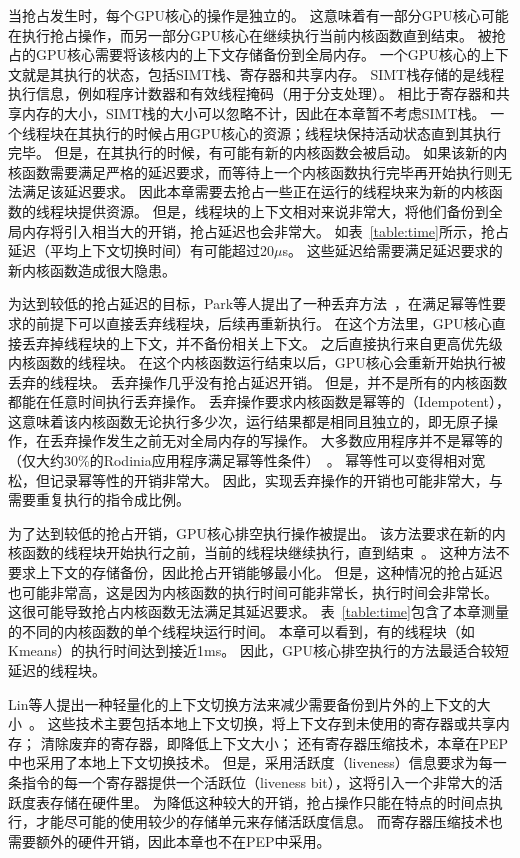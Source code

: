 当抢占发生时，每个GPU核心的操作是独立的。
这意味着有一部分GPU核心可能在执行抢占操作，而另一部分GPU核心在继续执行当前内核函数直到结束。
被抢占的GPU核心需要将该核内的上下文存储备份到全局内存。
一个GPU核心的上下文就是其执行的状态，包括SIMT栈、寄存器和共享内存。
SIMT栈存储的是线程执行信息，例如程序计数器和有效线程掩码（用于分支处理）。
相比于寄存器和共享内存的大小，SIMT栈的大小可以忽略不计，因此在本章暂不考虑SIMT栈。
一个线程块在其执行的时候占用GPU核心的资源；线程块保持活动状态直到其执行完毕。
但是，在其执行的时候，有可能有新的内核函数会被启动。
如果该新的内核函数需要满足严格的延迟要求，而等待上一个内核函数执行完毕再开始执行则无法满足该延迟要求。
因此本章需要去抢占一些正在运行的线程块来为新的内核函数的线程块提供资源。
但是，线程块的上下文相对来说非常大，将他们备份到全局内存将引入相当大的开销，抢占延迟也会非常大。
如表~\ref{table:time}所示，抢占延迟（平均上下文切换时间）有可能超过20$\mu$s。
这些延迟给需要满足延迟要求的新内核函数造成很大隐患。

为达到较低的抢占延迟的目标，Park等人提出了一种丢弃方法~，在满足幂等性要求的前提下可以直接丢弃线程块，后续再重新执行。
在这个方法里，GPU核心直接丢弃掉线程块的上下文，并不备份相关上下文。
之后直接执行来自更高优先级内核函数的线程块。
在这个内核函数运行结束以后，GPU核心会重新开始执行被丢弃的线程块。
丢弃操作几乎没有抢占延迟开销。
但是，并不是所有的内核函数都能在任意时间执行丢弃操作。
丢弃操作要求内核函数是幂等的（Idempotent），这意味着该内核函数无论执行多少次，运行结果都是相同且独立的，即无原子操作，在丢弃操作发生之前无对全局内存的写操作。
大多数应用程序并不是幂等的（仅大约30\%的Rodinia应用程序满足幂等性条件）~。
幂等性可以变得相对宽松，但记录幂等性的开销非常大。
因此，实现丢弃操作的开销也可能非常大，与需要重复执行的指令成比例。

为了达到较低的抢占开销，GPU核心排空执行操作被提出。
该方法要求在新的内核函数的线程块开始执行之前，当前的线程块继续执行，直到结束~。
这种方法不要求上下文的存储备份，因此抢占开销能够最小化。
但是，这种情况的抢占延迟也可能非常高，这是因为内核函数的执行时间可能非常长，执行时间会非常长。
这很可能导致抢占内核函数无法满足其延迟要求。
表~\ref{table:time}包含了本章测量的不同的内核函数的单个线程块运行时间。
本章可以看到，有的线程块（如Kmeans）的执行时间达到接近1ms。
因此，GPU核心排空执行的方法最适合较短延迟的线程块。

Lin等人提出一种轻量化的上下文切换方法来减少需要备份到片外的上下文的大小~。
这些技术主要包括本地上下文切换，将上下文存到未使用的寄存器或共享内存；
清除废弃的寄存器，即降低上下文大小；
还有寄存器压缩技术，本章在PEP中也采用了本地上下文切换技术。
但是，采用活跃度（liveness）信息要求为每一条指令的每一个寄存器提供一个活跃位（liveness bit），这将引入一个非常大的活跃度表存储在硬件里。
为降低这种较大的开销，抢占操作只能在特点的时间点执行，才能尽可能的使用较少的存储单元来存储活跃度信息。
而寄存器压缩技术也需要额外的硬件开销，因此本章也不在PEP中采用。

